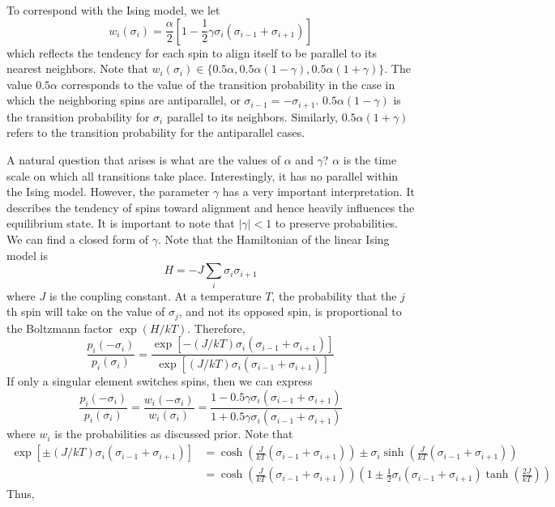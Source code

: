 \documentclass[12pt]{article}
\theoremstyle{definition}
\theoremstyle{remark}
\begin{document}
To correspond with the Ising model, we let 
\[
w_i(\sigma_i) = \frac{\alpha}{2}\left[1 - \frac{1}{2} \gamma \sigma_i (\sigma_{i-1} + \sigma_{i+1}) \right]
\]
which reflects the tendency for each spin to align itself to be parallel to its nearest neighbors. Note that $w_i(\sigma_i) \in \{0.5\alpha, 0.5\alpha(1 - \gamma), 0.5\alpha(1+\gamma)\}$. The value $0.5\alpha$ corresponds to the value of the transition probability in the case in which the neighboring spins are antiparallel, or $\sigma_{i-1} = - \sigma_{i+1}$. $0.5\alpha(1-\gamma)$ is the transition probability for $\sigma_i$ parallel to its neighbors. Similarly, $0.5\alpha(1+\gamma)$ refers to the transition probability for the antiparallel cases.

A natural question that arises is what are the values of $\alpha$ and $\gamma$? $\alpha$ is the time scale on which all transitions take place. Interestingly, it has no parallel within the Ising model. However, the parameter $\gamma$ has a very important interpretation. It describes the tendency of spins toward alignment and hence heavily influences the equilibrium state. It is important to note that $|\gamma| < 1$ to preserve probabilities. We can find a closed form of $\gamma$. Note that the Hamiltonian of the linear Ising model is 
\[
H = -J \sum_i \sigma_i \sigma_{i+1}
\]
where $J$ is the coupling constant. At a temperature $T$, the probability that the $j$th spin will take on the value of $\sigma_j$, and not its opposed spin, is proportional to the Boltzmann factor $\exp(H/kT)$. Therefore,
\[
\frac{p_i(-\sigma_i)}{p_i(\sigma_i)} = \frac{\exp \left[ -(J/kT)\sigma_i(\sigma_{i-1} + \sigma_{i+1})\right]}{\exp \left[ (J/kT)\sigma_i(\sigma_{i-1} + \sigma_{i+1})\right]}
\]
If only a singular element switches spins, then we can express 
\[
\frac{p_i(-\sigma_i)}{p_i(\sigma_i)} = \frac{w_i(-\sigma_i)}{w_i(\sigma_i)} = \frac{1 - 0.5\gamma \sigma_i (\sigma_{i-1} + \sigma_{i+1})}{1 + 0.5\gamma \sigma_i (\sigma_{i-1} + \sigma_{i+1})}
\]
where $w_i$ is the probabilities as discussed prior. 
Note that 
\begin{align*}
    \exp\left[\pm (J/kT)\sigma_i (\sigma_{i-1} + \sigma_{i+1}) \right] &= \cosh\left(\frac{J}{kT}(\sigma_{i-1} + \sigma_{i+1})\right) \pm \sigma_i \sinh \left(\frac{J}{kT}(\sigma_{i-1} + \sigma_{i+1})\right)\\
    &= \cosh\left(\frac{J}{kT}(\sigma_{i-1} + \sigma_{i+1}) \right) \left( 1 \pm \frac{1}{2} \sigma_i (\sigma_{i-1} + \sigma_{i+1}) \tanh \left( \frac{2J}{kT} \right) \right)
\end{align*}
Thus, 
\end{document}
